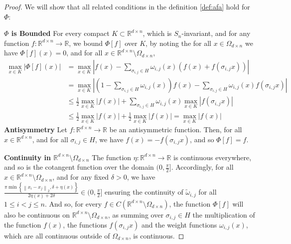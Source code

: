 \documentclass[10pt,a4paper]{amsart}
\newcommand{\RR}{\mathbb{R}}
\newcommand{\abs}[1]{\left\lvert#1\right\rvert}
\begin{document}
\begin{proof}
	 We will show that all related conditions in the definition \ref{def:afa} hold for $\Phi$:
	 
	\textbf{$\Phi$ is Bounded} 
For every compact $K \subset \RR^{d \times n}$, which is $S_n$-invariant, and for any function $f: \RR^{d \times n} \to \RR$, we bound $\Phi[f]$ over $K$, by noting the for all $x \in  \Omega_{d\times n}$ we have $\Phi[f](x)=0 $, and for all $x \in \RR^{d\times n}\setminus \Omega_{d\times n}$,	
\begin{equation}
		\begin{split}
			\max_{x \in K}{\abs{\Phi[f](x)}} 
            &= 
			\max_{x \in K}{\abs{f(x) - \sum_{\sigma_{i,j} \in H}{\omega_{i,j}(x)\left(f(x) + f(\sigma_{i,j} x) \right)}}}
			\\
			&=
			\max_{x \in K}{\abs{\left(1 - \sum_{\sigma_{i,j} \in H}{\omega_{i, j}(x)}\right)f(x) - \sum_{\sigma_{i,j} \in H}{\omega_{i,j}(x) f(\sigma_{i,j} x)}}}
			\\
			&\leq 
			\frac{1}{2}\max_{x \in K}{\abs{f(x)}} + \sum_{\sigma_{i,j} \in H}{\omega_{i,j}(x) \max_{x \in K}{\abs{f(\sigma_{i,j} x)}}}
			\\
			&\leq \frac{1}{2}\max_{x \in K}{\abs{f(x)}} + \frac{1}{2}\max_{x \in K}{\abs{f(x)}} = \max_{x \in K}{\abs{f(x)}}
		\end{split}
	\end{equation} 
	\textbf{Antisymmetry}
	  Let $f:\RR^{d\times n}\to \RR$ be an antisymmetric function. Then, for all $x \in \RR^{d \times n}$, and for all $\sigma_{i,j} \in H$, we have $f(x) = -f(\sigma_{i,j} x)$, and so $\Phi[f] = f$. 
	
	\textbf{Continuity in $\RR^{d\times n}\setminus \Omega_{d\times n}$} The function $\eta: \RR^{d \times n} \to \RR$ is continuous everywhere, and so is the cotangent function over the domain $(0, \frac{\pi}{2}]$. Accordingly, for all $x \in \RR^{d \times n} \setminus{\Omega_{d \times n}}$, and for any fixed $\delta > 0$, we have $\frac{\pi\min{\left\{\left\| x_i - x_j \right\|_2, \delta + \eta(x) \right\}}}{2\eta(x) + 2\delta} \in (0, \frac{\pi}{2}]$ ensuring the continuity of $\tilde{\omega}_{i, j}$ for all $1 \leq i < j \leq n$. And so, for every $f\in  C\left(\RR^{d \times n} \setminus \Omega_{d\times n} \right)$, the function $\Phi[f]$ will also be continuous on $\RR^{d\times n}\setminus \Omega_{d\times n} $, as summing over $\sigma_{i, j} \in H$ the multiplication of the function $f(x)$, the functions $f(\sigma_{i,j}x)$ and the weight functions $\omega_{i,j}(x)$, which are all continuous outside of $\Omega_{d \times n}$, is continuous.
	

\end{proof}
\end{document}

